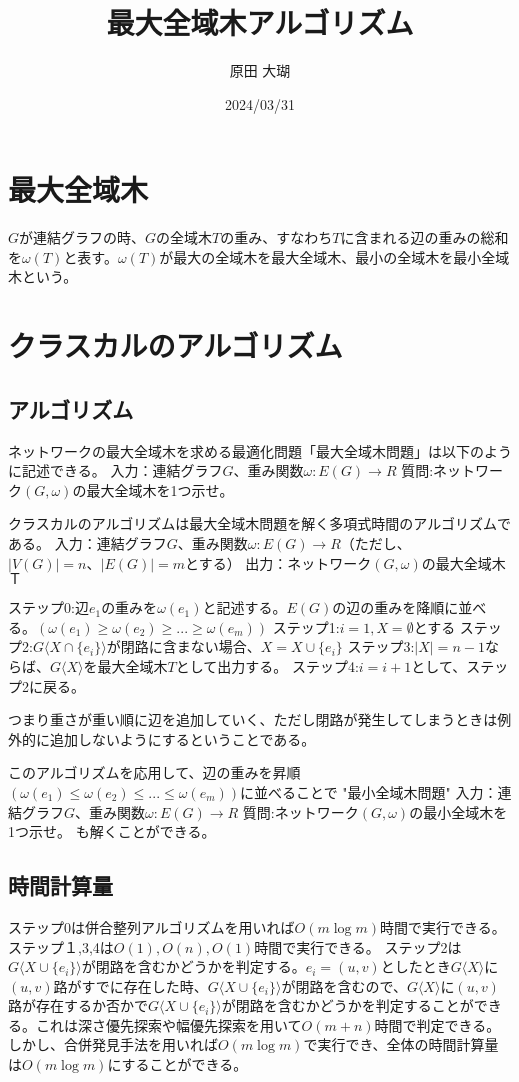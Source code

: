 \documentclass[twocolumn]{jarticle}
\title{最大全域木アルゴリズム}
\author{原田 大瑚}
\date{2024/03/31}
\begin{document}
\maketitle

\section{最大全域木}
$G$が連結グラフの時、$G$の全域木$T$の重み、すなわち$T$に含まれる辺の重みの総和を$\omega(T)$と表す。$\omega(T)$が最大の全域木を最大全域木、最小の全域木を最小全域木という。

\section{クラスカルのアルゴリズム}
\subsection{アルゴリズム}
ネットワークの最大全域木を求める最適化問題「最大全域木問題」は以下のように記述できる。
入力：連結グラフ$G$、重み関数$\omega:E(G)\rightarrow R$
質問:ネットワーク$(G,\omega)$の最大全域木を1つ示せ。

クラスカルのアルゴリズムは最大全域木問題を解く多項式時間のアルゴリズムである。
入力：連結グラフ$G$、重み関数$\omega:E(G)\rightarrow R$（ただし、$|V(G)|=n、|E(G)|=m$とする）
出力：ネットワーク$(G,\omega)$の最大全域木$Ｔ$

ステップ0:辺$e_1$の重みを$\omega(e_1)$と記述する。$E(G)$の辺の重みを降順に並べる。$(\omega(e_1) \ge \omega(e_2)\ge...\ge \omega(e_m))$
ステップ1:$i=1,X=\emptyset$とする
ステップ2:$G\langle X\cap \{e_i\}\rangle$が閉路に含まない場合、$X=X\cup\{e_i\}$
ステップ3:$|X|=n-1$ならば、$G\langle X\rangle$を最大全域木$T$として出力する。
ステップ4:$i=i+1$として、ステップ2に戻る。


つまり重さが重い順に辺を追加していく、ただし閉路が発生してしまうときは例外的に追加しないようにするということである。

このアルゴリズムを応用して、辺の重みを昇順$(\omega(e_1)\le \omega(e_2)\le...\le\omega(e_m))$に並べることで
"最小全域木問題"
入力：連結グラフ$G$、重み関数$\omega:E(G)\rightarrow R$
質問:ネットワーク$(G,\omega)$の最小全域木を1つ示せ。
も解くことができる。

\subsection{時間計算量}
ステップ0は併合整列アルゴリズムを用いれば$O(m\log m)$時間で実行できる。ステップ１,3,4は$O(1),O(n),O(1)$時間で実行できる。
ステップ2は$G\langle X\cup\{e_i\}\rangle$が閉路を含むかどうかを判定する。$e_i=(u,v)$としたとき$G\langle X\rangle$に$(u,v)$路がすでに存在した時、$G\langle X\cup\{e_i\}\rangle$が閉路を含むので、$G\langle X\rangle$に$(u,v)$路が存在するか否かで$G\langle X\cup\{e_i\}\rangle$が閉路を含むかどうかを判定することができる。これは深さ優先探索や幅優先探索を用いて$O(m+n)$時間で判定できる。
しかし、合併発見手法を用いれば$O(m\log m)$で実行でき、全体の時間計算量は$O(m\log m)$にすることができる。
\end{document}
